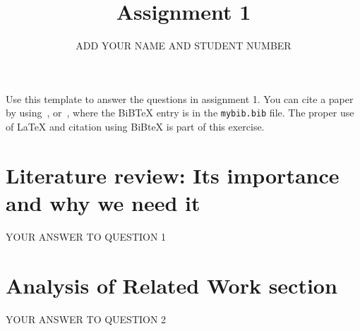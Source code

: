 \documentclass{article}
\title{Assignment 1}
\author{ADD YOUR NAME AND STUDENT NUMBER}
\date{}
\begin{document}
\maketitle

Use this template to answer the questions in assignment 1. You can cite a paper by using~\citep{booth:ea:2011}, or~\cite{booth:ea:2011}, where the BiBTeX entry is in the \texttt{mybib.bib} file. The proper use of \LaTeX{} and citation using BiBteX is part of this exercise. 

\section{Literature review: Its importance and why we need it}


YOUR ANSWER TO QUESTION 1

\section{Analysis of Related Work section}

YOUR ANSWER TO QUESTION 2





\end{document}

